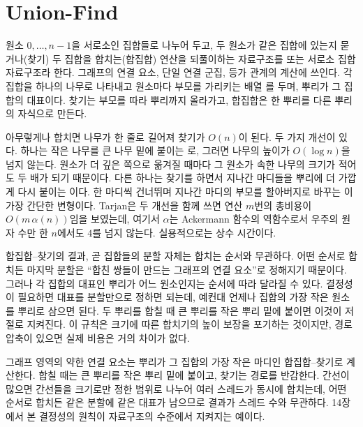\section{Union-Find}
\label{sec:union-find}

원소 $0,\dots,n-1$을 서로소인 집합들로 나누어 두고, 두 원소가 같은 집합에 있는지 묻거나(찾기) 두 집합을 합치는(합집합) 연산을 되풀이하는 자료구조를  또는 서로소 집합 자료구조라 한다\cite{galler1964}. 그래프의 연결 요소, 단일 연결 군집, 등가 관계의 계산에 쓰인다. 각 집합을 하나의 나무로 나타내고 원소마다 부모를 가리키는 배열 를 두며, 뿌리가 그 집합의 대표이다. 찾기는 부모를 따라 뿌리까지 올라가고, 합집합은 한 뿌리를 다른 뿌리의 자식으로 만든다.

아무렇게나 합치면 나무가 한 줄로 길어져 찾기가 $O(n)$이 된다. 두 가지 개선이 있다. 하나는 작은 나무를 큰 나무 밑에 붙이는 로, 그러면 나무의 높이가 $O(\log n)$을 넘지 않는다. 원소가 더 깊은 쪽으로 옮겨질 때마다 그 원소가 속한 나무의 크기가 적어도 두 배가 되기 때문이다. 다른 하나는 찾기를 하면서 지나간 마디들을 뿌리에 더 가깝게 다시 붙이는 이다. 한 마디씩 건너뛰며 지나간 마디의 부모를 할아버지로 바꾸는 이 가장 간단한 변형이다. Tarjan은 두 개선을 함께 쓰면 연산 $m$번의 총비용이 $O(m\,\alpha(n))$임을 보였는데\cite{tarjan1975,tarjan1984worst}, 여기서 $\alpha$는 Ackermann 함수의 역함수로서 우주의 원자 수만 한 $n$에서도 $4$를 넘지 않는다. 실용적으로는 상수 시간이다.

합집합--찾기의 결과, 곧 집합들의 분할 자체는 합치는 순서와 무관하다. 어떤 순서로 합치든 마지막 분할은 ``합친 쌍들이 만드는 그래프의 연결 요소''로 정해지기 때문이다. 그러나 각 집합의 대표인 뿌리가 어느 원소인지는 순서에 따라 달라질 수 있다. 결정성이 필요하면 대표를 분할만으로 정하면 되는데, 예컨대 언제나 집합의 가장 작은 원소를 뿌리로 삼으면 된다. 두 뿌리를 합칠 때 큰 뿌리를 작은 뿌리 밑에 붙이면 이것이 저절로 지켜진다. 이 규칙은 크기에 따른 합치기의 높이 보장을 포기하는 것이지만, 경로 압축이 있으면 실제 비용은 거의 차이가 없다.

\begin{instardust}
그래프 영역의 약한 연결 요소는 뿌리가 그 집합의 가장 작은 마디인 합집합--찾기로 계산한다. 합칠 때는 큰 뿌리를 작은 뿌리 밑에 붙이고, 찾기는 경로를 반감한다. 간선이 많으면 간선들을 크기로만 정한 범위로 나누어 여러 스레드가 동시에 합치는데, 어떤 순서로 합치든 같은 분할에 같은 대표가 남으므로 결과가 스레드 수와 무관하다. 14장에서 본 결정성의 원칙이 자료구조의 수준에서 지켜지는 예이다.
\end{instardust}

